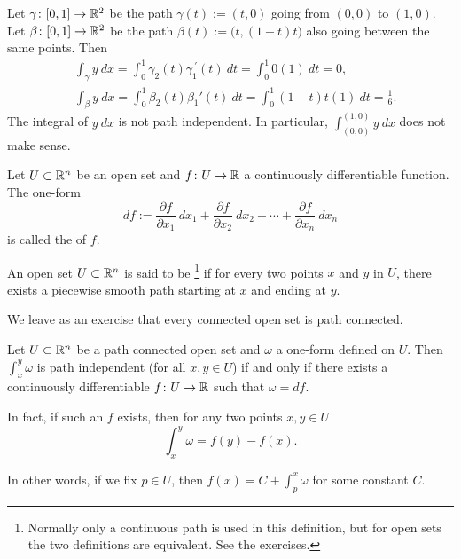 \begin{example}
Let $\gamma \colon [0,1] \to {\mathbb{R}}^2$ be the path $\gamma(t) := (t,0)$
going from $(0,0)$ to $(1,0)$.  Let $\beta \colon [0,1] \to {\mathbb{R}}^2$ be the path
$\beta(t) := \bigl(t,(1-t)t\bigr)$ also going between the same points.  Then
\begin{align*}
& \int_\gamma y ~ dx = 
\int_0^1 \gamma_2(t) \gamma_1^{\:\prime}(t) ~ dt
=
\int_0^1 0 (1) ~ dt = 0 ,\\
& \int_\beta y ~ dx = 
\int_0^1 \beta_2(t) \beta_1'(t) ~ dt
=
\int_0^1 (1-t)t(1) ~ dt = \frac{1}{6} .
\end{align*}
The integral of $y~dx$ is not path independent.
In particular,
$\int_{(0,0)}^{(1,0)} y~dx$ does not make sense.
\end{example}

\begin{defn}
Let $U \subset {\mathbb{R}}^n$ be an open set and $f \colon U \to {\mathbb{R}}$ a 
continuously differentiable function.  The one-form
\begin{equation*}
df :=
\frac{\partial f}{\partial x_1} ~ dx_1 + 
\frac{\partial f}{\partial x_2} ~ dx_2 + \cdots +
\frac{\partial f}{\partial x_n} ~ dx_n 
\end{equation*}
is called the \emph{} of $f$.

An open set $U \subset {\mathbb{R}}^n$ is said to be \emph{}%
\footnote{Normally only a continuous path is used in this definition, but
for open sets the two definitions are equivalent.  See the exercises.}
if for every two points $x$ and $y$ in $U$, there exists a piecewise smooth
path starting at $x$ and ending at $y$.
\end{defn}

We leave as an exercise that every connected open set is path
connected.

\begin{prop} \label{mv:prop:pathinddf}
Let $U \subset {\mathbb{R}}^n$ be a path connected open set and $\omega$ a one-form
defined on $U$.  Then
$\int_x^y \omega$
is path independent (for all $x,y \in U$) if and only if there exists
a continuously differentiable $f \colon U \to {\mathbb{R}}$ such that $\omega = df$.

In fact, if such an $f$ exists, then for any two points $x,y \in U$
\begin{equation*}
\int_{x}^y \omega = f(y)-f(x) .
\end{equation*}
\end{prop}

In other words, if we fix $p \in U$, then $f(x) = C + \int_{p}^x \omega$
for some constant $C$.


